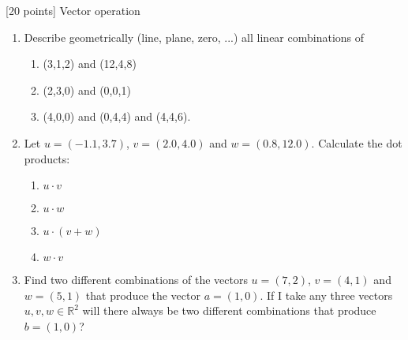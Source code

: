 [20 points] Vector operation\\

\vspace{0.1in}

\begin{enumerate}
\item 
Describe geometrically (line, plane, zero, ...) all linear combinations of 
\begin{enumerate}
\item (3,1,2) and (12,4,8)
\item (2,3,0) and (0,0,1)
\item (4,0,0) and (0,4,4) and (4,4,6).
\end{enumerate}

\item Let $u = (-1.1, 3.7)$, $v = (2.0, 4.0)$ and $w = (0.8, 12.0)$. Calculate the dot products:
\begin{enumerate}
\item $u\cdot v$
\item $u\cdot w$
\item $u\cdot(v+w)$
\item $w\cdot v$
\end{enumerate}

\item Find two different combinations of the vectors $u = (7, 2)$, $v = (4, 1)$ and $w = (5, 1)$ that produce the vector $a = (1, 0)$. 
If I take any three vectors $u, v, w\in \mathbb{R}^2$ will there always be two different combinations that produce $b = (1, 0)$?

\end{enumerate}
